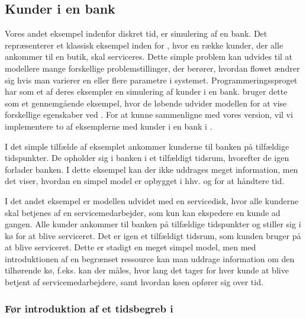 \subsection{Kunder i en bank}\label{bank-eksempel}
Vores andet eksempel indenfor diskret tid, er simulering af en bank. Det repræsenterer et klassisk eksempel inden for \des, hvor en række kunder, der alle 
ankommer til en butik, skal serviceres. Dette simple problem kan 
udvides til at modellere mange forskellige problemstillinger, der berører, 
hvordan flowet ændrer sig hvis man varierer en eller flere parametre
i systemet. Programmeringssproget \simpy\cite{simpy} har som et af deres 
eksempler en simulering af kunder i en bank. \simpy bruger dette som et 
gennemgående eksempel, hvor de løbende udvider modellen for at vise 
forskellige egenskaber ved \simpy. For at kunne sammenligne \simpy  med vores 
version, vil vi implementere to af eksemplerne med kunder 
i en bank i \pycsp.

I det simple tilfælde af eksemplet ankommer kunderne til banken på 
tilfældige tidspunkter.  De opholder sig i banken i et tilfældigt 
tidsrum, hvorefter de igen forlader banken. I dette eksempel kan der ikke 
uddrages meget information, men det viser, hvordan en simpel model er opbygget i 
hhv.  \simpy og \pycsp for at håndtere tid.

I det andet eksempel er modellen udvidet med en servicedisk, hvor alle 
kunderne skal betjenes af en servicemedarbejder, som kun kan ekspedere en kunde ad 
gangen. Alle kunder ankommer til banken på tilfældige tidspunkter  og stiller sig i 
kø for at blive serviceret. Det er igen et tilfældigt tidsrum, som kunden bruger på at blive 
serviceret.  Dette er stadigt en meget simpel model, men med introduktionen af 
en begrænset ressource kan man uddrage information om den tilhørende kø, f.eks. 
kan der måles, hvor lang det tager for hver kunde at blive betjent af 
servicemedarbejdere, samt hvordan køen opfører sig over tid. 

\subsubsection{Før introduktion af et tidsbegreb i \pycsp}

